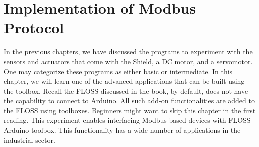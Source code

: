 \chapter {Implementation of Modbus Protocol}
\thispagestyle{empty}
\label{modbus}

\newcommand{\LocMODfig}{\Origin/user-code/modbus/figures}
\newcommand{\LocMODscicode}{\Origin/user-code/modbus/scilab}
\newcommand{\LocMODscibrief}[1]{{\tt \seqsplit{%
        Origin/user-code/modbus/scilab}}, see \fnrefp{fn:file-loc}}
\newcommand{\LocMODardcode}{\Origin/user-code/modbus/arduino}
\newcommand{\LocMODardbrief}[1]{{\tt \seqsplit{%
        Origin/user-code/modbus/arduino}}, see \fnrefp{fn:file-loc}}

\newcommand{\LocMODpycode}{\Origin/user-code/modbus/python}
\newcommand{\LocMODpybrief}[1]{{\tt \seqsplit{%
        Origin/user-code/modbus/python}}, see \fnrefp{fn:file-loc}}


\newcommand{\LocMODjuliacode}{\Origin/user-code/modbus/julia}
\newcommand{\LocMODjuliabrief}[1]{{\tt \seqsplit{%
        Origin/user-code/modbus/julia}}, see \fnrefp{fn:file-loc}}




\newcommand{\LocMODOpenModelicacode}{\Origin/user-code/modbus/OpenModelica}
\newcommand{\LocMODOpenModelicabrief}[1]{{\tt \seqsplit{%
        Origin/user-code/modbus/OpenModelica}}, see \fnrefp{fn:file-loc}}


In the previous chapters, we have discussed the programs to experiment with the sensors and actuators that come with the Shield, a DC motor, and a servomotor. One may categorize these programs as either basic or intermediate. In this chapter, we will learn one of the advanced applications that can be built using the toolbox. Recall the FLOSS discussed in the book, by default, does not have the capability to connect to Arduino. All such add-on functionalities are added to the FLOSS using toolboxes. Beginners might want to skip this chapter in the first reading. This experiment enables interfacing Modbus-based devices with FLOSS-Arduino toolbox. This functionality has a wide number of applications in the industrial sector.


